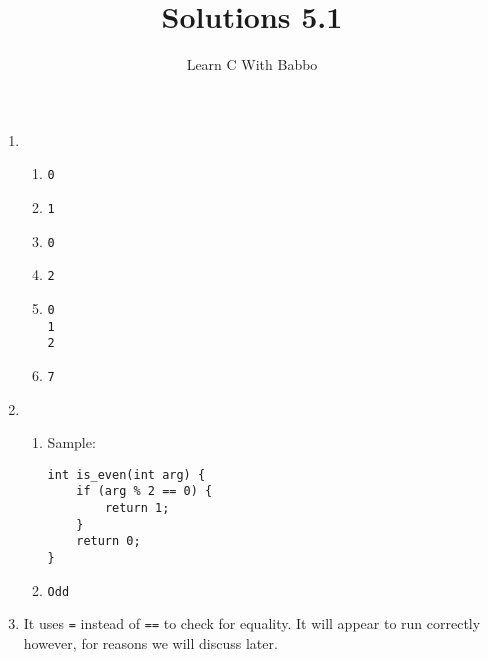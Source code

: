 \documentclass{article}
\begin{document}
\title{Solutions 5.1}
\author{Learn C With Babbo}
\date{}
\maketitle
\begin{enumerate}
\item
\begin{enumerate}
\item 
\begin{lstlisting}[style=CStyle]
0
\end{lstlisting}

\item 
\begin{lstlisting}[style=CStyle]
1
\end{lstlisting}

\item
\begin{lstlisting}[style=CStyle]
0
\end{lstlisting}

\item
\begin{lstlisting}[style=CStyle]
2
\end{lstlisting}

\item
\begin{lstlisting}[style=CStyle]
0
1
2
\end{lstlisting}

\item
\begin{lstlisting}[style=CStyle]
7
\end{lstlisting}
\end{enumerate}

\item 

\begin{enumerate}
\item Sample:
\begin{lstlisting}[style=CStyle]
int is_even(int arg) {
    if (arg % 2 == 0) {
        return 1;
    }
    return 0;
}
\end{lstlisting}

\item
\begin{lstlisting}[style=CStyle]
Odd
\end{lstlisting}
\end{enumerate}

\item
It uses \verb|=| instead of \verb|==| to check for equality. It will appear to run correctly however, for reasons
we will discuss later.
\end{enumerate}
\end{document}
